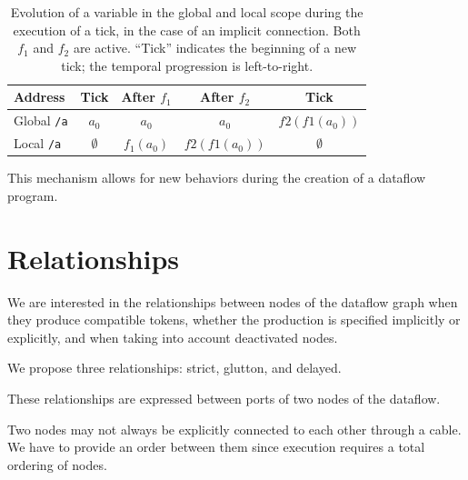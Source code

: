\documentclass{article}
\begin{document}
\begin{table}[h]
	\centering
	\footnotesize
	\begin{tabular}{l|cccc}
		Address & Tick & After $f_1$ & After $f_2$ & Tick \\
		\midrule
		Global \lstinline|/a|  & $a_0$ & $a_0$ & $a_0$ & $f2(f1(a_0))$\\
		Local \lstinline|/a|   & $\emptyset$ & $f_1(a_0)$ & $f2(f1(a_0))$ & $\emptyset$ \\	
	\end{tabular}
	\caption{Evolution of a variable in the global and local scope during the execution of a tick, in the case of an implicit connection. Both $f_1$ and $f_2$ are active. 
        ``Tick'' indicates the beginning of a new tick; the temporal progression is left-to-right.}
	\label{tbl.evolution}
\end{table}

This mechanism allows for new behaviors during the creation of a dataflow program.

	
	
    
\section{Relationships}
\label{sec.relationships}
We are interested in the relationships between nodes of the dataflow graph when they produce compatible tokens, whether the production is specified implicitly or explicitly, and when taking into account deactivated nodes.
    
We propose three relationships: strict, glutton, and delayed.

These relationships are expressed between ports of two nodes of the dataflow.

Two nodes may not always be explicitly connected to each other through a cable. 
We have to provide an order between them since execution requires a total ordering of nodes.
\end{document}

